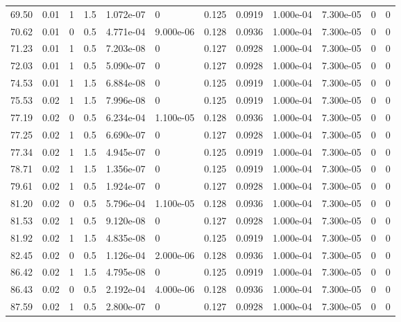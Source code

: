 \documentclass[preview]{standalone}
\begin{document}
{{{\begin{tabular}{L{1.2cm}C{1.2cm} C{0.3cm}C{0.5cm} C{1.4cm}C{1.4cm} C{1.4cm}C{1.4cm} C{1.6cm}C{1.6cm} C{1.6cm}C{1.6cm}}
  69.50  &  0.01  & 1     & 1.5 &  1.072e-07  & 0  &  0.125&   0.0919& 1.000e-04 & 7.300e-05   &  0 & 0  \\ 
  70.62  &  0.01  & 0     & 0.5 &  4.771e-04  & 9.000e-06  &  0.128&   0.0936& 1.000e-04 & 7.300e-05   &  0 & 0  \\ 
  71.23  &  0.01  & 1     & 0.5 &  7.203e-08  & 0  &  0.127&   0.0928& 1.000e-04 & 7.300e-05   &  0 & 0  \\ 
  72.03  &  0.01  & 1     & 0.5 &  5.090e-07  & 0  &  0.127&   0.0928& 1.000e-04 & 7.300e-05   &  0 & 0  \\ 
  74.53  &  0.01  & 1     & 1.5 &  6.884e-08  & 0  &  0.125&   0.0919& 1.000e-04 & 7.300e-05   &  0 & 0  \\ 
  75.53  &  0.02  & 1     & 1.5 &  7.996e-08  & 0  &  0.125&   0.0919& 1.000e-04 & 7.300e-05   &  0 & 0  \\ 
  77.19  &  0.02  & 0     & 0.5 &  6.234e-04  & 1.100e-05  &  0.128&   0.0936& 1.000e-04 & 7.300e-05   &  0 & 0  \\ 
  77.25  &  0.02  & 1     & 0.5 &  6.690e-07  & 0  &  0.127&   0.0928& 1.000e-04 & 7.300e-05   &  0 & 0  \\ 
  77.34  &  0.02  & 1     & 1.5 &  4.945e-07  & 0  &  0.125&   0.0919& 1.000e-04 & 7.300e-05   &  0 & 0  \\ 
  78.71  &  0.02  & 1     & 1.5 &  1.356e-07  & 0  &  0.125&   0.0919& 1.000e-04 & 7.300e-05   &  0 & 0  \\ 
  79.61  &  0.02  & 1     & 0.5 &  1.924e-07  & 0  &  0.127&   0.0928& 1.000e-04 & 7.300e-05   &  0 & 0  \\ 
  81.20  &  0.02  & 0     & 0.5 &  5.796e-04  & 1.100e-05  &  0.128&   0.0936& 1.000e-04 & 7.300e-05   &  0 & 0  \\ 
  81.53  &  0.02  & 1     & 0.5 &  9.120e-08  & 0  &  0.127&   0.0928& 1.000e-04 & 7.300e-05   &  0 & 0  \\ 
  81.92  &  0.02  & 1     & 1.5 &  4.835e-08  & 0  &  0.125&   0.0919& 1.000e-04 & 7.300e-05   &  0 & 0  \\ 
  82.45  &  0.02  & 0     & 0.5 &  1.126e-04  & 2.000e-06  &  0.128&   0.0936& 1.000e-04 & 7.300e-05   &  0 & 0  \\ 
  86.42  &  0.02  & 1     & 1.5 &  4.795e-08  & 0  &  0.125&   0.0919& 1.000e-04 & 7.300e-05   &  0 & 0  \\ 
  86.43  &  0.02  & 0     & 0.5 &  2.192e-04  & 4.000e-06  &  0.128&   0.0936& 1.000e-04 & 7.300e-05   &  0 & 0  \\ 
  87.59  &  0.02  & 1     & 0.5 &  2.800e-07  & 0  &  0.127&   0.0928& 1.000e-04 & 7.300e-05   &  0 & 0  \\ 

\end{tabular}}}}
\end{document}
